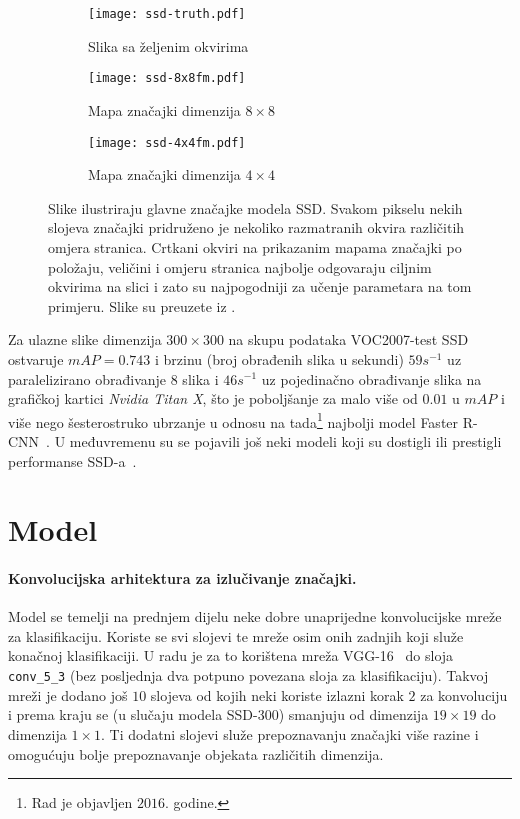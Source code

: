 \documentclass[utf8, diplomski, numeric, lmodern]{fer}
\begin{document}
\begin{figure}[htbp] \centering
	\begin{subfigure}[b]{0.32\textwidth} \centering
		\texttt{[image: ssd-truth.pdf]}
		\caption{Slika sa željenim okvirima}
	\end{subfigure}
    \begin{subfigure}[b]{0.32\textwidth} \centering
		\texttt{[image: ssd-8x8fm.pdf]}
		\caption{Mapa značajki dimenzija $8\times8$}
	\end{subfigure}
	\begin{subfigure}[b]{0.32\textwidth} \centering
		\texttt{[image: ssd-4x4fm.pdf]}
		\caption{Mapa značajki dimenzija $4\times4$}
	\end{subfigure}
	\caption{Slike ilustriraju glavne značajke modela SSD. Svakom pikselu nekih slojeva značajki pridruženo je nekoliko razmatranih okvira različitih omjera stranica. Crtkani okviri na prikazanim mapama značajki po položaju, veličini i omjeru stranica najbolje odgovaraju ciljnim okvirima na slici i zato su najpogodniji za učenje parametara na tom primjeru. Slike su preuzete iz \cite{ssd}.}
	\label{fig:ssd-default-boxes}
\end{figure}

Za ulazne slike dimenzija $300\times300$ na skupu podataka VOC2007-test SSD ostvaruje $\mathit{mAP}=0.743$ i brzinu (broj obrađenih slika u sekundi) $59 s^{-1}$ uz paralelizirano obrađivanje 8 slika i $46 s^{-1}$ uz pojedinačno obrađivanje slika na grafičkoj kartici \emph{Nvidia Titan X}, što je poboljšanje za malo više od $0.01$ u $\mathit{mAP}$ i više nego šesterostruko ubrzanje u odnosu na tada\footnote{Rad je objavljen $2016$. godine.} najbolji model Faster R-CNN~\cite{fasterrcnn}.
U međuvremenu su se pojavili još neki modeli koji su dostigli ili prestigli performanse SSD-a~\cite{pvanet, yolov2}. 


\section{Model} \label{sec:ssd-model}

\paragraph{Konvolucijska arhitektura za izlučivanje značajki.}
Model se temelji na prednjem dijelu neke dobre unaprijedne konvolucijske mreže za klasifikaciju. Koriste se svi slojevi te mreže osim onih zadnjih koji služe konačnoj klasifikaciji. U radu je za to korištena mreža VGG-16~\cite{vgg} do sloja \texttt{conv\_5\_3} (bez posljednja dva potpuno povezana sloja za klasifikaciju). Takvoj mreži je dodano još $10$ slojeva od kojih neki koriste izlazni korak $2$ za konvoluciju i prema kraju se (u slučaju modela SSD-300) smanjuju od dimenzija $19\times 19$ do dimenzija $1\times 1$. Ti dodatni slojevi služe prepoznavanju značajki više razine i omogućuju bolje prepoznavanje objekata različitih dimenzija. 
\end{document}
